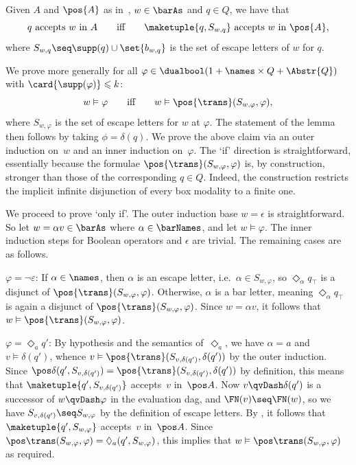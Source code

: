\documentclass[10pt, final, conference, a4paper, twocolumn]{IEEEtran}
\renewcommand{\enquote}[1]{`#1'}
\begin{document}
\begin{lem}\label{lem:helperDual2Pos}
 Given $A$ and $\pos{A}$ as in~, $w \in \barAs$ and $q\in Q$, we have that
\[ \text{$q$ accepts~$w$ in $A$}\qquad\text{iff}\qquad
  \text{$\maketuple{q,S_{w,q}}$ accepts~$w$ in~$\pos{A}$},\]
  where $S_{w,q} \seq \supp(q) \cup \set{b_{w,q}}$ is the set of escape
  letters of $w$ for $q$.
\end{lem}
\begin{IEEEproof}
  We prove more generally for all 
  $\varphi \in \dualbool(1 + \names \times Q + \Abstr{Q})$ with
  $\card{\supp(\varphi)} \leqslant k$:
\[ \text{$w \vDash \varphi$}\qquad\text{iff}\qquad
  \text{$w \vDash \pos{\trans}({S_{w,\varphi}}, \varphi)$},\] 
where $S_{w,\varphi}$ is the set of escape letters for $w$ at $\varphi$. The statement of the lemma then follows by taking $\phi=\delta(q)$. We prove the above claim via an outer induction on~$w$ and an inner induction
  on~$\varphi$. The \enquote{if} direction is straightforward, essentially because the
  formulae $\pos{\trans}({S_{w,\varphi}}, \varphi)$ is, by construction,
  stronger than those of the corresponding $q \in Q$. Indeed, the construction
  {restricts} the implicit infinite disjunction of every
  box modality to a finite one.

  We proceed to prove \enquote{only if}. The outer induction base
  $w=\epsilon$ is straightforward. So let $w = \alpha v \in \barAs$ where
  $\alpha \in \barNames$, and let $w\vDash\varphi$. The inner induction
  steps for Boolean operators and $\epsilon$ are trivial. The remaining
  cases are as follows.

  $\varphi = \neg\varepsilon$: If $\alpha \in \names$, then $\alpha$
  is an escape letter, i.e.~$\alpha\in S_{w,\varphi}$, so $\Diamond_\alpha
  q_\top$ is a disjunct of $\pos{\trans}({S_{w,\varphi}}, \varphi)$.
  Otherwise, $\alpha$ is a bar letter, meaning $\Diamond_\alpha q_\top$
  is again a disjunct of $\pos{\trans}({S_{w,\varphi}}, \varphi)$.
  Since $w=\alpha v$, it follows that $w \vDash \pos{\trans}({S_{w,\varphi}}, \varphi)$.

  $\varphi = \Diamond_a q'$: By hypothesis and the semantics
  of~$\Diamond_a$, we have $\alpha=a$ and $v\vDash\delta(q')$,
  whence $v\vDash\pos{\trans}({S_{v,\delta(q')}}, \delta(q'))$
  by the outer induction. Since
  $\pos\delta(q',S_{v,\delta(q')})=\pos{\trans}({S_{v,\delta(q')}}, \delta(q'))$
  by definition, this means that $\maketuple{q',S_{v,\delta(q')}}$
  accepts~$v$ in~$\pos A$. Now $v\qvDash\delta(q')$ is a successor of
  $w\qvDash\varphi$ in the evaluation dag, and $\FN(v)\seq\FN(w)$,
  so we have $S_{v,\delta(q')}\seq S_{w,\varphi}$ by the
  definition of escape letters. By , it
  follows that $\maketuple{q',S_{w,\varphi}}$ accepts~$v$ in~$\pos A$.
  Since $\pos\trans({S_{w,\varphi}}, \varphi)=\Diamond_a(q',S_{w,\varphi})$, this
  implies that $w\vDash\pos\trans({S_{w,\varphi}}, \varphi)$ as required.



\end{IEEEproof}
\end{document}
